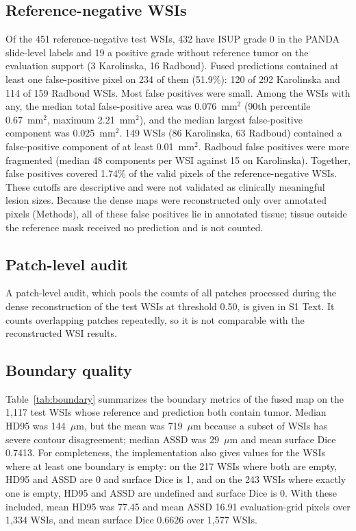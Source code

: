 \documentclass[10pt,letterpaper]{article}
\begin{document}
\subsection*{Reference-negative WSIs}
Of the 451 reference-negative test WSIs, 432 have ISUP grade 0 in the PANDA slide-level labels and 19 a positive grade without reference tumor on the evaluation support (3 Karolinska, 16 Radboud). Fused predictions contained at least one false-positive pixel on 234 of them (51.9\%): 120 of 292 Karolinska and 114 of 159 Radboud WSIs. Most false positives were small. Among the WSIs with any, the median total false-positive area was 0.076~mm$^2$ (90th percentile 0.67~mm$^2$, maximum 2.21~mm$^2$), and the median largest false-positive component was 0.025~mm$^2$. 149 WSIs (86 Karolinska, 63 Radboud) contained a false-positive component of at least 0.01~mm$^2$. Radboud false positives were more fragmented (median 48 components per WSI against 15 on Karolinska). Together, false positives covered 1.74\% of the valid pixels of the reference-negative WSIs. These cutoffs are descriptive and were not validated as clinically meaningful lesion sizes. Because the dense maps were reconstructed only over annotated pixels (Methods), all of these false positives lie in annotated tissue; tissue outside the reference mask received no prediction and is not counted.

\subsection*{Patch-level audit}
A patch-level audit, which pools the counts of all patches processed during the dense reconstruction of the test WSIs at threshold 0.50, is given in S1 Text. It counts overlapping patches repeatedly, so it is not comparable with the reconstructed WSI results.

\subsection*{Boundary quality}
Table~\ref{tab:boundary} summarizes the boundary metrics of the fused map on the 1,117 test WSIs whose reference and prediction both contain tumor. Median HD95 was 144~$\mu$m, but the mean was 719~$\mu$m because a subset of WSIs has severe contour disagreement; median ASSD was 29~$\mu$m and mean surface Dice 0.7413. For completeness, the implementation also gives values for the WSIs where at least one boundary is empty: on the 217 WSIs where both are empty, HD95 and ASSD are 0 and surface Dice is 1, and on the 243 WSIs where exactly one is empty, HD95 and ASSD are undefined and surface Dice is 0. With these included, mean HD95 was 77.45 and mean ASSD 16.91 evaluation-grid pixels over 1,334 WSIs, and mean surface Dice 0.6626 over 1,577 WSIs.
\end{document}
